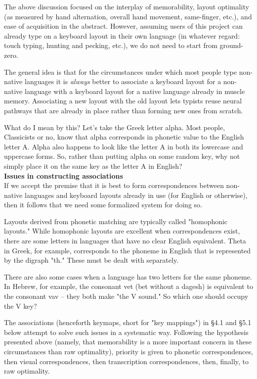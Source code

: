 \documentclass[11pt]{article}
\begin{document}
The above discussion focused on the interplay of memorability, layout optimality (as measured by hand alternation, overall hand movement, same-finger, etc.), and ease of acquisition in the abstract. However, assuming users of this project can already type on a keyboard layout in their own language (in whatever regard: touch typing, hunting and pecking, etc.), we do not need to start from ground-zero.

The general idea is that for the circumstances under which most people type non-native languages it is \emph{always} better to associate a keyboard layout for a non-native language with a keyboard layout for a native language already in muscle memory. Associating a new layout with the old layout lets typists reuse neural pathways that are already in place rather than forming new ones from scratch.

What do I mean by this? Let's take the Greek letter alpha. Most people, Classicists or no, know that alpha corresponds in phonetic value to the English letter A. Alpha also happens to look like the letter A in both its lowercase and uppercase forms. So, rather than putting alpha on some random key, why not simply place it on the same key as the letter A in English? \\

\noindent \textbf{Issues in constructing associations} \\

If we accept the premise that it is best to form correspondences between non-native languages and keyboard layouts already in use (for English or otherwise), then it follows that we need some formalized system for doing so.

Layouts derived from phonetic matching are typically called "homophonic layouts." While homophonic layouts are excellent when correspondences exist, there are some letters in languages that have no clear English equivalent. Theta in Greek, for example, corresponds to the phoneme in English that is represented by the digraph "th." These must be dealt with separately.

There are also some cases when a language has two letters for the same phoneme. In Hebrew, for example, the consonant vet (bet without a dagesh) is equivalent to the consonant vav -- they both make "the V sound." So which one should occupy the V key?

The associations (henceforth keymaps, short for "key mappings") in §4.1 and §5.1 below attempt to solve such issues in a systematic way. Following the hypothesis presented above (namely, that memorability is a more important concern in these circumstances than raw optimality), priority is given to phonetic correspondences, then visual correspondences, then transcription correspondences, then, finally, to raw optimality.
\end{document}
